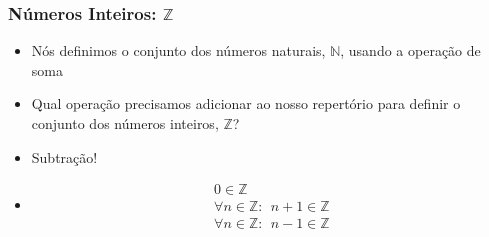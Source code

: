 \documentclass[usenames,dvipsnames,svgnames]{beamer}
\begin{document}
\begin{frame}
	
	\frametitle{Números Inteiros: $\mathbb{Z}$}

	\begin{itemize}
		\item Nós definimos o conjunto dos números naturais, $\mathbb{N}$, usando a operação de soma
		\item Qual operação precisamos adicionar ao nosso repertório para definir o conjunto dos números inteiros, $\mathbb{Z}$?
		\item Subtração!
		\item
			\begin{equation}
			\begin{aligned}
				0 \in \mathbb{Z} \\
				\forall n \in \mathbb{Z}: ~~ n+1 \in \mathbb{Z} \\
				\forall n \in \mathbb{Z}: ~~ n-1 \in \mathbb{Z}
			\end{aligned}
			\end{equation}
 	\end{itemize}

\end{frame}
\end{document}
